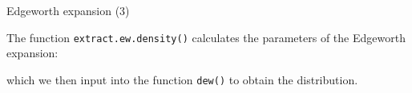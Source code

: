 \begin{frame}[fragile]{Edgeworth expansion (3)}

The function \texttt{extract.ew.density()} calculates the parameters of
the Edgeworth expansion:

\begin{Shaded}
\begin{Highlighting}[]
\StringTok{ }\NormalTok{(} \NormalTok{(}\NormalTok{,}\NormalTok{), }
                       \NormalTok{, }\NormalTok{, }
                        \NormalTok{(}\NormalTok{))}
\end{Highlighting}
\end{Shaded}

which we then input into the function \texttt{dew()} to obtain the
distribution.

\begin{Shaded}
\begin{Highlighting}[]
\StringTok{ }
\StringTok{ }
\OperatorTok{$}\OperatorTok{$}\OperatorTok{$}
\end{Highlighting}
\end{Shaded}

\end{frame}

